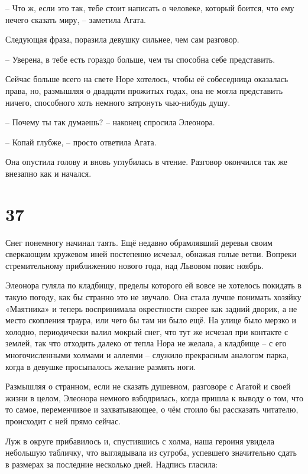 \documentclass[
  a5paperpaper,
  DIV=11,
  numbers=noendperiod]{scrreprt}
\begin{document}
-- Что ж, если это так, тебе стоит написать о человеке, который боится,
что ему нечего сказать миру, -- заметила Агата.

Следующая фраза, поразила девушку сильнее, чем сам разговор.

-- Уверена, в тебе есть гораздо больше, чем ты способна себе
представить.

Сейчас больше всего на свете Норе хотелось, чтобы её собеседница
оказалась права, но, размышляя о двадцати прожитых годах, она не могла
представить ничего, способного хоть немного затронуть чью-нибудь душу.

-- Почему ты так думаешь? -- наконец спросила Элеонора.

-- Копай глубже, -- просто ответила Агата.

Она опустила голову и вновь углубилась в чтение. Разговор окончился так
же внезапно как и начался.

\section*{37}\label{37}


Снег понемногу начинал таять. Ещё недавно обрамлявший деревья своим
сверкающим кружевом иней постепенно исчезал, обнажая голые ветви.
Вопреки стремительному приближению нового года, над Львовом повис
ноябрь.

Элеонора гуляла по кладбищу, пределы которого ей вовсе не хотелось
покидать в такую погоду, как бы странно это не звучало. Она стала лучше
понимать хозяйку «Маятника» и теперь воспринимала окрестности скорее как
задний дворик, а не место скопления траура, или чего бы там ни было ещё.
На улице было мерзко и холодно, периодически валил мокрый снег, что тут
же исчезал при контакте с землей, так что отходить далеко от тепла Нора
не желала, а кладбище -- с его многочисленными холмами и аллеями --
служило прекрасным аналогом парка, когда в девушке просыпалось желание
размять ноги.

Размышляя о странном, если не сказать душевном, разговоре с Агатой и
своей жизни в целом, Элеонора немного взбодрилась, когда пришла к выводу
о том, что то самое, переменчивое и захватывающее, о чём стоило бы
рассказать читателю, происходит с ней прямо сейчас.

Луж в округе прибавилось и, спустившись с холма, наша героиня увидела
небольшую табличку, что выглядывала из сугроба, успевшего значительно
сдать в размерах за последние несколько дней. Надпись гласила:
\end{document}
